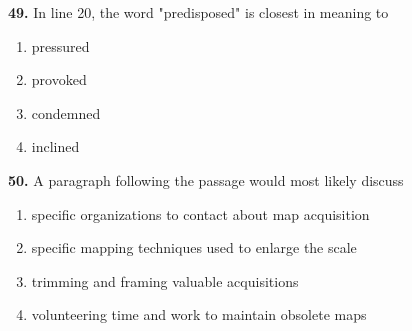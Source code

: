 \documentclass[12pt]{article}
\begin{document}
\par
\vspace{0.25\baselineskip}
\noindent\textbf{49.} In line 20, the word "predisposed" is closest in meaning to
\begin{enumerate}[label=(\Alph*),leftmargin=*,itemsep=0.2em]
\item pressured
\item provoked
\item condemned
\item inclined
\end{enumerate}
\par
\vspace{0.25\baselineskip}
\noindent\textbf{50.} A paragraph following the passage would most likely discuss
\begin{enumerate}[label=(\Alph*),leftmargin=*,itemsep=0.2em]
\item specific organizations to contact about map acquisition
\item specific mapping techniques used to enlarge the scale
\item trimming and framing valuable acquisitions
\item volunteering time and work to maintain obsolete maps
\end{enumerate}
\par
\vspace{0.25\baselineskip}
\end{document}
